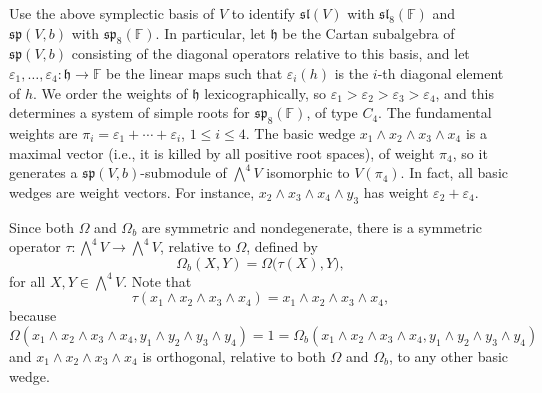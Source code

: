 \documentclass[a4paper,reqno]{amsart}
\theoremstyle{definition}
\numberwithin{theorem}{section}
\numberwithin{equation}{section}
\begin{document}
Use the above symplectic basis of $V$ to identify ${{\mathfrak{sl}}}(V)$ with ${{\mathfrak{sl}}}_8({\mathbb{F}})$ and ${{\mathfrak{sp}}}(V,b)$ with ${{\mathfrak{sp}}}_8({\mathbb{F}})$. In particular, let ${{\mathfrak h}}$ be the Cartan subalgebra of ${{\mathfrak{sp}}}(V,b)$ consisting of the diagonal operators relative to this basis, and let ${\varepsilon}_1,\ldots,{\varepsilon}_4:{{\mathfrak h}}\rightarrow {\mathbb{F}}$ be the linear maps such that ${\varepsilon}_i(h)$ is the $i$-th diagonal element of $h$. We order the weights of ${{\mathfrak h}}$ lexicographically, so ${\varepsilon}_1>{\varepsilon}_2>{\varepsilon}_3>{\varepsilon}_4$, and this determines a system of simple roots for ${{\mathfrak{sp}}}_8({\mathbb{F}})$, of type $C_4$. The fundamental weights are ${\pi}_i={\varepsilon}_1+\cdots+{\varepsilon}_i$, $1\leq i\leq 4$. The basic wedge $x_1\wedge x_2\wedge x_3\wedge x_4$ is a maximal vector (i.e., it is killed by all positive root spaces), of weight ${\pi}_4$, so it generates a ${{\mathfrak{sp}}}(V,b)$-submodule of $\bigwedge^4V$ isomorphic to $V({\pi}_4)$. In fact, all basic wedges are weight vectors. For instance, $x_2\wedge x_3\wedge x_4\wedge y_3$ has weight ${\varepsilon}_2+{\varepsilon}_4$.

Since both $\Omega$ and $\Omega_b$ are symmetric and nondegenerate, there is a symmetric operator $\tau:\bigwedge^4V\rightarrow \bigwedge^4V$, relative to $\Omega$, defined by
\[
\Omega_b(X,Y)=\Omega\bigl(\tau(X),Y\bigr),
\]
for all $X,Y\in\bigwedge^4V$. Note that 
\begin{equation}\label{eq:tau_x1x2x3x4}
\tau(x_1\wedge x_2\wedge x_3\wedge x_4)=x_1\wedge x_2\wedge x_3\wedge x_4,
\end{equation}
because 
\[
\Omega(x_1\wedge x_2\wedge x_3\wedge x_4,y_1\wedge y_2\wedge y_3\wedge y_4)=1=\Omega_b(x_1\wedge x_2\wedge x_3\wedge x_4,y_1\wedge y_2\wedge y_3\wedge y_4)
\] 
and $x_1\wedge x_2\wedge x_3\wedge x_4$ is orthogonal, relative to both $\Omega$ and $\Omega_b$, to any other basic wedge.
\end{document}
